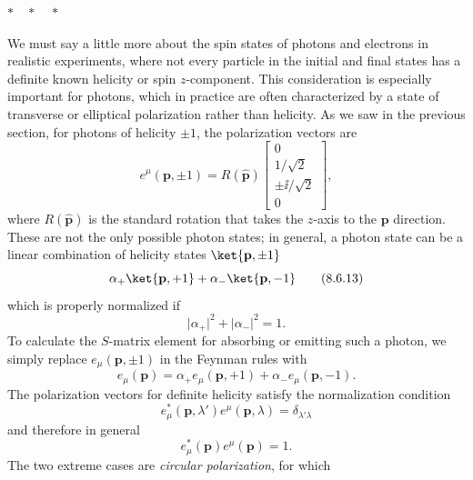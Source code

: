\begin{center}
$*\quad *\quad *$
\end{center}

We must say a little more about the spin states of photons and electrons in
realistic experiments, where not every particle in the initial and final
states has a definite known helicity or spin $z$-component. This consideration
is especially important for photons, which in practice are often characterized
by a state of transverse or elliptical polarization rather than helicity. As
we saw in the previous section, for photons of helicity $\mathord\pm1$, the
polarization vectors are
\[
e^\mu(\mathbf p,\mathord\pm1)=R(\widehat{\mathbf p})
\begin{bmatrix}
0\\[1pt]1/\sqrt2\\[1pt]\mathord\pm \ii/\sqrt2\\[1pt]0
\end{bmatrix},
\]
where $R(\widehat{\mathbf p})$ is the standard rotation that takes the
$z$-axis to the $\mathbf p$ direction. These are not the only possible photon
states; in general, a photon state can be a linear combination of helicity
states $\ket{\mathbf p,\mathord\pm1}$
\begin{equation}
\alpha_+\ket{\mathbf p,+1}+\alpha_-\ket{\mathbf p,-1}
\tag{8.6.13}\label{eq:8.6.13}
\end{equation}
which is properly normalized if
\begin{equation}
\lvert\alpha_+\rvert^2+\lvert\alpha_-\rvert^2=1.
\tag{8.6.14}\label{eq:8.6.14}
\end{equation}
To calculate the $S$-matrix element for absorbing or emitting such a photon,
we simply replace $e_\mu(\mathbf p,\mathord\pm1)$ in the Feynman rules with
\begin{equation}
e_\mu(\mathbf p)=\alpha_+e_\mu(\mathbf p,+1)
+\alpha_-e_\mu(\mathbf p,-1).
\tag{8.6.15}\label{eq:8.6.15}
\end{equation}
The polarization vectors for definite helicity satisfy the normalization
condition
\begin{equation}
e_\mu^*(\mathbf p,\lambda')e^\mu(\mathbf p,\lambda)
=\delta_{\lambda'\lambda}
\tag{8.6.16}\label{eq:8.6.16}
\end{equation}
and therefore in general
\begin{equation}
e_\mu^*(\mathbf p)e^\mu(\mathbf p)=1.
\tag{8.6.17}\label{eq:8.6.17}
\end{equation}
The two extreme cases are \emph{circular polarization}, for which
